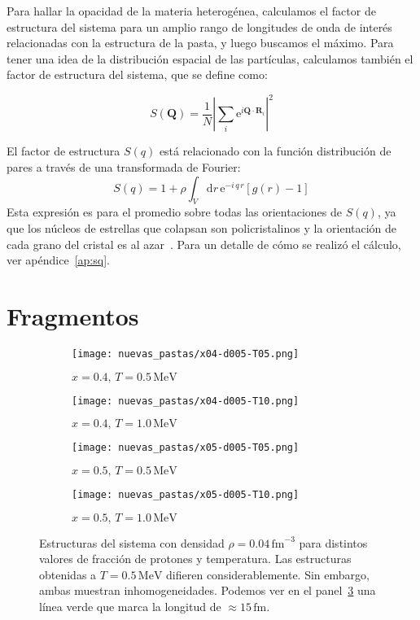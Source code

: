 Para hallar la opacidad de la materia heterogénea, calculamos el factor de estructura del sistema para un amplio rango de longitudes de onda de interés relacionadas con la estructura de la pasta, y luego buscamos el máximo.
Para tener una idea de la distribución espacial de las partículas, calculamos también el factor de estructura del sistema, que se define como:

\begin{equation*}
  S(\mathbf{Q}) = \frac{1}{N} |\sum_i \text{e}^{i\mathbf{Q}\cdot\mathbf{R}_i}|^2
\end{equation*}

El factor de estructura $S(q)$ está relacionado con la función distribución de pares a través de una transformada de Fourier:
\begin{equation}
S(q) = 1 + \rho \int_V{\text{d}r\, \text{e}^{-i\,q\,r} \left[g(r) - 1\right]}
\end{equation}
Esta expresión es para el promedio sobre todas las orientaciones de $S(q)$, ya que los núcleos de estrellas que colapsan son policristalinos y la orientación de cada grano del cristal es al azar~\cite{sonoda_impact_2007}.
Para un detalle de cómo se realizó el cálculo, ver apéndice~\ref{ap:sq}.

\section{Fragmentos}\label{sc:clusters}

\begin{figure}[h!]  \centering
  \begin{subfigure}[h!]{0.40\columnwidth}
    \texttt{[image: nuevas\_pastas/x04-d005-T05.png]}
    \caption{$x=0.4,\, T=0.5\,\text{MeV}$}
    \label{subfig:04-05}
  \end{subfigure}
  \begin{subfigure}[h!]{0.40\columnwidth}
    \texttt{[image: nuevas\_pastas/x04-d005-T10.png]}
    \caption{$x=0.4,\, T=1.0\,\text{MeV}$}
    \label{subfig:04-10}
  \end{subfigure}
  \begin{subfigure}[h!]{0.40\columnwidth}
    \texttt{[image: nuevas\_pastas/x05-d005-T05.png]}
    \caption{$x=0.5,\, T=0.5\,\text{MeV}$}
    \label{subfig:05-05}
  \end{subfigure}
  \begin{subfigure}[h!]{0.40\columnwidth}
    \texttt{[image: nuevas\_pastas/x05-d005-T10.png]}
    \caption{$x=0.5,\, T=1.0\,\text{MeV}$}
    \label{subfig:05-10}
  \end{subfigure}
  \caption{Estructuras del sistema con densidad $\rho = 0.04\,\text{fm}^{-3}$ para distintos valores de fracción de protones y temperatura.
    Las estructuras obtenidas a $T=0.5\,\text{MeV}$ difieren considerablemente.
    Sin embargo, ambas muestran inhomogeneidades.
    Podemos ver en el panel~\ref{subfig:05-05} una línea verde que marca la longitud de $\approx 15\,\text{fm}$.}
  \label{fig:morpho}
\end{figure}

